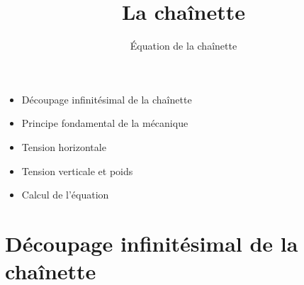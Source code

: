 

   





\title{{\bf La chaînette}}
\subtitle{\'Equation de la chaînette}

\begin{frame}
  
  \debutmontitre

  \pause

{\footnotesize
\hfill
{}
\begin{minipage}{0.6\textwidth}
  \begin{itemize}
    \item<3-> Découpage infinitésimal de la chaînette
    \item<4-> Principe fondamental de la mécanique
    \item<5-> Tension horizontale
    \item<6-> Tension verticale et poids
    \item<7-> Calcul de l'équation
  \end{itemize}
\end{minipage}
}

\end{frame}

\setcounter{framenumber}{0}


\section{Découpage infinitésimal de la chaînette}

